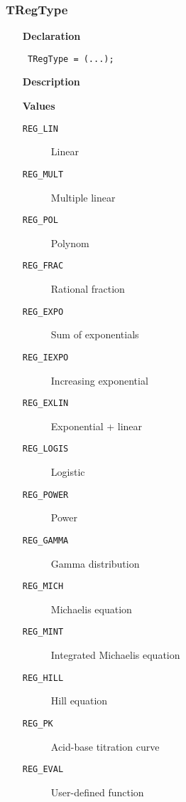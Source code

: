 \documentclass[12pt,a4paper,oneside]{report}
\newcommand{\declarationitem}[1]{\textbf{#1}}
\newcommand{\descriptiontitle}[1]{\textbf{#1}}
\newcommand{\code}[1]{\texttt{#1}}
\begin{document}
\subsubsection{TRegType}
\label{umodels-TRegType}
\begin{itemize}\item[\declarationitem{Declaration}\hfill]
	\begin{flushleft}
		\code{
			TRegType = (...);}
	\end{flushleft}
	\item[\descriptiontitle{Description}]
	\item[\textbf{Values}]
	\begin{description}
		\item[\texttt{REG{\_}LIN}] Linear
		\item[\texttt{REG{\_}MULT}] Multiple linear
		\item[\texttt{REG{\_}POL}] Polynom
		\item[\texttt{REG{\_}FRAC}] Rational fraction
		\item[\texttt{REG{\_}EXPO}] Sum of exponentials
		\item[\texttt{REG{\_}IEXPO}] Increasing exponential
		\item[\texttt{REG{\_}EXLIN}] Exponential + linear
		\item[\texttt{REG{\_}LOGIS}] Logistic
		\item[\texttt{REG{\_}POWER}] Power
		\item[\texttt{REG{\_}GAMMA}] Gamma distribution
		\item[\texttt{REG{\_}MICH}] Michaelis equation
		\item[\texttt{REG{\_}MINT}] Integrated Michaelis equation
		\item[\texttt{REG{\_}HILL}] Hill equation
		\item[\texttt{REG{\_}PK}] Acid{-}base titration curve
		\item[\texttt{REG{\_}EVAL}] User{-}defined function
	\end{description}
\end{itemize}
\end{document}
